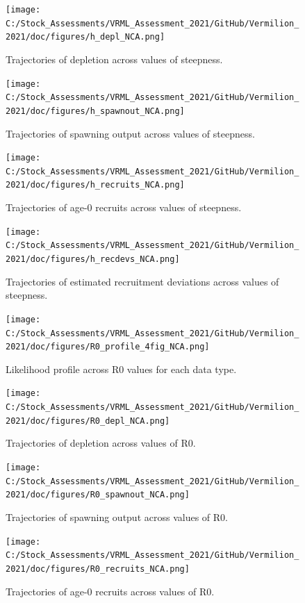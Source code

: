 \documentclass[11pt,
  english,
]{article}
\begin{document}
\begin{figure}
\centering
\texttt{[image: C:/Stock\_Assessments/VRML\_Assessment\_2021/GitHub/Vermilion\_2021/doc/figures/h\_depl\_NCA.png]}
\caption{Trajectories of depletion across values of steepness.\label{fig:h-depl}}
\end{figure}

\begin{figure}
\centering
\texttt{[image: C:/Stock\_Assessments/VRML\_Assessment\_2021/GitHub/Vermilion\_2021/doc/figures/h\_spawnout\_NCA.png]}
\caption{Trajectories of spawning output across values of steepness.\label{fig:h-spawn}}
\end{figure}

\begin{figure}
\centering
\texttt{[image: C:/Stock\_Assessments/VRML\_Assessment\_2021/GitHub/Vermilion\_2021/doc/figures/h\_recruits\_NCA.png]}
\caption{Trajectories of age-0 recruits across values of steepness.\label{fig:h-recruits}}
\end{figure}

\begin{figure}
\centering
\texttt{[image: C:/Stock\_Assessments/VRML\_Assessment\_2021/GitHub/Vermilion\_2021/doc/figures/h\_recdevs\_NCA.png]}
\caption{Trajectories of estimated recruitment deviations across values of steepness.\label{fig:h-recdevs}}
\end{figure}

\begin{figure}
\centering
\texttt{[image: C:/Stock\_Assessments/VRML\_Assessment\_2021/GitHub/Vermilion\_2021/doc/figures/R0\_profile\_4fig\_NCA.png]}
\caption{Likelihood profile across R0 values for each data type.\label{fig:r0-profile}}
\end{figure}

\begin{figure}
\centering
\texttt{[image: C:/Stock\_Assessments/VRML\_Assessment\_2021/GitHub/Vermilion\_2021/doc/figures/R0\_depl\_NCA.png]}
\caption{Trajectories of depletion across values of R0.\label{fig:r0-depl}}
\end{figure}

\begin{figure}
\centering
\texttt{[image: C:/Stock\_Assessments/VRML\_Assessment\_2021/GitHub/Vermilion\_2021/doc/figures/R0\_spawnout\_NCA.png]}
\caption{Trajectories of spawning output across values of R0.\label{fig:r0-spawn}}
\end{figure}

\begin{figure}
\centering
\texttt{[image: C:/Stock\_Assessments/VRML\_Assessment\_2021/GitHub/Vermilion\_2021/doc/figures/R0\_recruits\_NCA.png]}
\caption{Trajectories of age-0 recruits across values of R0.\label{fig:r0-recruits}}
\end{figure}
\end{document}
